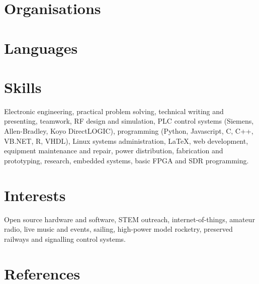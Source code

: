 \documentclass[11pt,a4paper,sans]{moderncv}        %
\begin{document}
\section{Organisations}

\section{Languages}

\section{Skills}
Electronic engineering, practical problem solving, technical writing and presenting, teamwork, RF design and simulation, PLC control systems (Siemens, Allen-Bradley, Koyo DirectLOGIC), programming (Python, Javascript, C, C++, VB.NET, R, VHDL), Linux systems administration, \LaTeX, web development, equipment maintenance and repair, power distribution, fabrication and prototyping, research, embedded systems, basic FPGA and SDR programming.

\section{Interests}
Open source hardware and software, STEM outreach, internet-of-things, amateur radio, live music and events, sailing, high-power model rocketry, preserved railways and signalling control systems.

\section{References}
\end{document}
